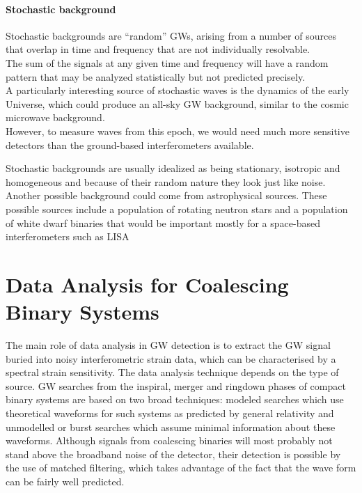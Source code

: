\documentclass[binding=0.6cm, LaM]{sapthesis}
\begin{document}
\subsubsection{Stochastic background}

	Stochastic backgrounds are “random” GWs, 
	arising from a  number of sources that overlap 
	in time and frequency that are not individually resolvable. \\

	The sum of the signals at any given time and frequency will have 
	a random pattern that may be analyzed statistically but not predicted precisely. \\
	A particularly interesting source of stochastic waves is the dynamics of the early Universe, 
	which could produce an all-sky GW background, 
	similar to the cosmic microwave background. \\
	However, to measure waves from this epoch, 
	we would need much more sensitive detectors than the ground-based interferometers available.
	
	Stochastic backgrounds are usually idealized as being stationary, 
	isotropic and homogeneous and because of their random nature they look just like noise.	\\
	Another possible background could come from astrophysical sources. 
	These possible sources include a population of rotating neutron stars 
	and a population of white dwarf binaries that would be important mostly for a space-based interferometers such as LISA 

\chapter{Data Analysis for Coalescing Binary Systems}

	The main role of data analysis in GW detection is to extract the GW signal 
	buried into noisy interferometric strain data, which can be characterised by a spectral strain sensitivity.
	The data analysis technique depends on the type of source.
	GW searches from the inspiral, merger and ringdown phases of compact binary systems 
	are based on two broad techniques: 
	modeled searches which use theoretical waveforms for such systems 
	as predicted by general relativity and 
	unmodelled or burst searches which assume minimal information about these waveforms. \cite[p. 2] {bar}
	Although signals from coalescing binaries will most probably not stand above the broadband noise of the detector, 
	their detection is possible by the use of matched filtering, 
	which takes advantage of the fact that the wave form can be fairly well predicted. 
\end{document}
